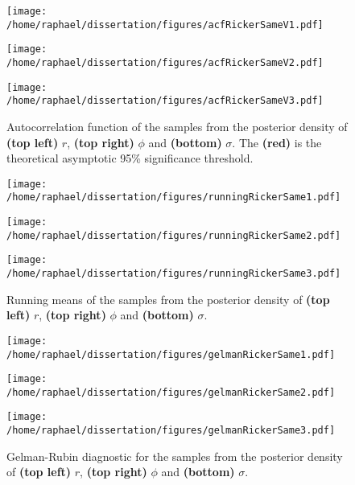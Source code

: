 \documentclass[12pt]{article}
\begin{document}
	\begin{figure}[htb]
		\centering
		\begin{minipage}{0.4\textwidth}
			\centering
			\texttt{[image: /home/raphael/dissertation/figures/acfRickerSameV1.pdf]}
		\end{minipage}
		\begin{minipage}{0.4\textwidth}
			\centering
			\texttt{[image: /home/raphael/dissertation/figures/acfRickerSameV2.pdf]}
		\end{minipage}
		\begin{minipage}{0.4\textwidth}
			\centering
			\texttt{[image: /home/raphael/dissertation/figures/acfRickerSameV3.pdf]}
		\end{minipage}
		\caption{Autocorrelation function of the samples from the posterior density of \textbf{(top left)} $r$, \textbf{(top right)} $\phi$ and \textbf{(bottom)} $\sigma$. The \textbf{(red)} is the theoretical asymptotic 95\% significance threshold.}
		\label{fig:acfDiag}
	\end{figure}
	
	\begin{figure}[htb]
		\centering
		\begin{minipage}{0.4\textwidth}
			\centering
			\texttt{[image: /home/raphael/dissertation/figures/runningRickerSame1.pdf]}
		\end{minipage}
		\begin{minipage}{0.4\textwidth}
			\centering
			\texttt{[image: /home/raphael/dissertation/figures/runningRickerSame2.pdf]}
		\end{minipage}
		\begin{minipage}{0.4\textwidth}
			\centering
			\texttt{[image: /home/raphael/dissertation/figures/runningRickerSame3.pdf]}
		\end{minipage}
		\caption{Running means of the samples from the posterior density of \textbf{(top left)} $r$, \textbf{(top right)} $\phi$ and \textbf{(bottom)} $\sigma$.}
		\label{fig:rmDiag}
	\end{figure}

\clearpage
	\begin{figure}[htb]
		\centering
		\begin{minipage}{0.4\textwidth}
			\centering
			\texttt{[image: /home/raphael/dissertation/figures/gelmanRickerSame1.pdf]}
		\end{minipage}
		\begin{minipage}{0.4\textwidth}
			\centering
			\texttt{[image: /home/raphael/dissertation/figures/gelmanRickerSame2.pdf]}
		\end{minipage}
		\begin{minipage}{0.4\textwidth}
			\centering
			\texttt{[image: /home/raphael/dissertation/figures/gelmanRickerSame3.pdf]}
		\end{minipage}
		\caption{Gelman-Rubin diagnostic for the samples from the posterior density of \textbf{(top left)} $r$, \textbf{(top right)} $\phi$ and \textbf{(bottom)} $\sigma$.}
		\label{fig:gelmanDiag}
	\end{figure}
	
\end{document}
